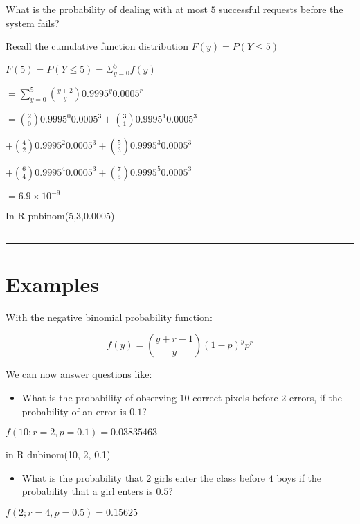 \documentclass[
]{book}
\providecommand{\tightlist}{%
  \setlength{\itemsep}{0pt}\setlength{\parskip}{0pt}}
\begin{document}
What is the probability of dealing with at most \(5\) successful requests before the system fails?

Recall the cumulative function distribution \(F(y)=P(Y\leq 5)\)

\(F(5)=P(Y\leq 5)=\Sigma_{y=0}^5 f(y)\)

\(=\sum_{y=0}^5\binom {y+2} y 0.9995^y 0.0005^r\)

\(=\binom {2} 0 0.9995^0 0.0005^3 +\binom {3} 1 0.9995^1 0.0005^3\)

\(+\binom {4} 2 0.9995^2 0.0005^3 +\binom {5} 3 0.9995^3 0.0005^3\)

\(+\binom {6} 4 0.9995^4 0.0005^3 +\binom {7} 5 0.9995^5 0.0005^3\)

\(= 6.9\times 10^{-9}\)

In R pnbinom(5,3,0.0005)

\begin{center}\rule{0.5\linewidth}{0.5pt}\end{center}

\begin{center}\rule{0.5\linewidth}{0.5pt}\end{center}

\hypertarget{examples}{%
\section{Examples}\label{examples}}

With the negative binomial probability function:

\[f(y)=\binom {y+r-1} y (1-p)^yp^r\]

We can now answer questions like:

\begin{itemize}
\tightlist
\item
  What is the probability of observing \(10\) correct pixels before \(2\) errors, if the probability of an error is \(0.1\)?
\end{itemize}

\(f(10; r=2, p=0.1)=0.03835463\)

in R dnbinom(10, 2, 0.1)

\begin{itemize}
\tightlist
\item
  What is the probability that \(2\) girls enter the class before \(4\) boys if the probability that a girl enters is \(0.5\)?
\end{itemize}

\(f(2; r=4, p=0.5)=0.15625\)
\end{document}
